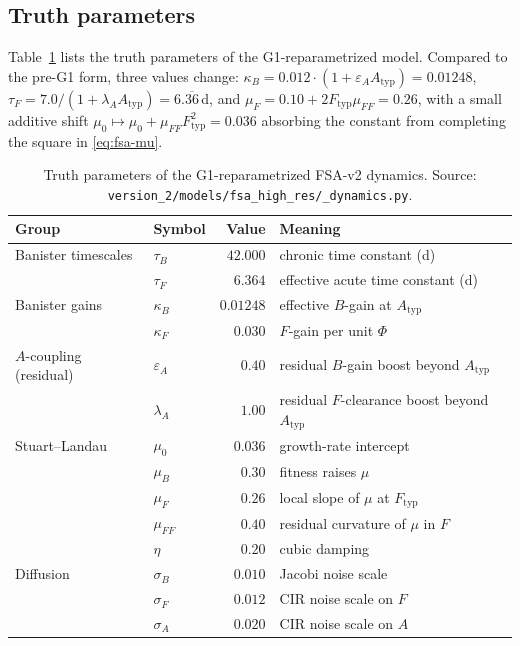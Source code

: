 \subsection{Truth parameters}

Table~\ref{tab:fsa-truth} lists the truth parameters of the
G1-reparametrized model. Compared to the pre-G1 form, three values
change: $\kappa_B = 0.012 \cdot (1+\varepsilon_A A_{\mathrm{typ}}) = 0.01248$,
$\tau_F = 7.0 / (1+\lambda_A A_{\mathrm{typ}}) = 6.\overline{36}\,$d,
and $\mu_F = 0.10 + 2 F_{\mathrm{typ}} \mu_{FF} = 0.26$, with a small
additive shift $\mu_0 \mapsto \mu_0 + \mu_{FF} F_{\mathrm{typ}}^2 = 0.036$
absorbing the constant from completing the square in
\eqref{eq:fsa-mu}.

\begin{table}[h]
\centering
\small
\begin{tabular}{@{}llrl@{}}
\toprule
Group & Symbol & Value & Meaning \\
\midrule
Banister timescales       & $\tau_B$              & $42.000$    & chronic time constant (d) \\
                          & $\tau_F$              & $6.364$     & effective acute time constant (d) \\
Banister gains            & $\kappa_B$            & $0.01248$   & effective $B$-gain at $A_{\mathrm{typ}}$ \\
                          & $\kappa_F$            & $0.030$     & $F$-gain per unit $\Phi$ \\
$A$-coupling (residual)   & $\varepsilon_A$       & $0.40$      & residual $B$-gain boost beyond $A_{\mathrm{typ}}$ \\
                          & $\lambda_A$           & $1.00$      & residual $F$-clearance boost beyond $A_{\mathrm{typ}}$ \\
Stuart--Landau            & $\mu_0$               & $0.036$     & growth-rate intercept \\
                          & $\mu_B$               & $0.30$      & fitness raises $\mu$ \\
                          & $\mu_F$               & $0.26$      & local slope of $\mu$ at $F_{\mathrm{typ}}$ \\
                          & $\mu_{FF}$            & $0.40$      & residual curvature of $\mu$ in $F$ \\
                          & $\eta$                & $0.20$      & cubic damping \\
Diffusion                 & $\sigma_B$            & $0.010$     & Jacobi noise scale \\
                          & $\sigma_F$            & $0.012$     & CIR noise scale on $F$ \\
                          & $\sigma_A$            & $0.020$     & CIR noise scale on $A$ \\
\bottomrule
\end{tabular}
\caption{Truth parameters of the G1-reparametrized FSA-v2 dynamics.
Source: \texttt{version\_2/models/fsa\_high\_res/\_dynamics.py}.}
\label{tab:fsa-truth}
\end{table}

